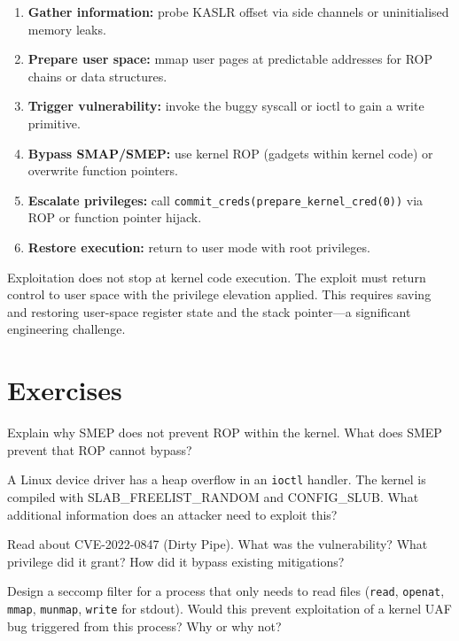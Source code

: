 \begin{enumerate}
	\item \textbf{Gather information:} probe KASLR offset via side channels or uninitialised memory leaks.
	\item \textbf{Prepare user space:} mmap user pages at predictable addresses for ROP chains or data structures.
	\item \textbf{Trigger vulnerability:} invoke the buggy syscall or ioctl to gain a write primitive.
	\item \textbf{Bypass SMAP/SMEP:} use kernel ROP (gadgets within kernel code) or overwrite function pointers.
	\item \textbf{Escalate privileges:} call \texttt{commit\_creds(prepare\_kernel\_cred(0))} via ROP or function pointer hijack.
	\item \textbf{Restore execution:} return to user mode with root privileges.
\end{enumerate}

\begin{principle}
	Exploitation does not stop at kernel code execution. The exploit must return control to user space with the privilege elevation applied. This requires saving and restoring user-space register state and the stack pointer---a significant engineering challenge.
\end{principle}

\section{Exercises}

\begin{exercise}
	Explain why SMEP does not prevent ROP within the kernel. What does SMEP prevent that ROP cannot bypass?
\end{exercise}

\begin{exercise}
	A Linux device driver has a heap overflow in an \texttt{ioctl} handler. The kernel is compiled with SLAB\_FREELIST\_RANDOM and CONFIG\_SLUB. What additional information does an attacker need to exploit this?
\end{exercise}

\begin{exercise}
	Read about CVE-2022-0847 (Dirty Pipe). What was the vulnerability? What privilege did it grant? How did it bypass existing mitigations?
\end{exercise}

\begin{exercise}
	Design a seccomp filter for a process that only needs to read files (\texttt{read}, \texttt{openat}, \texttt{mmap}, \texttt{munmap}, \texttt{write} for stdout). Would this prevent exploitation of a kernel UAF bug triggered from this process? Why or why not?
\end{exercise}
